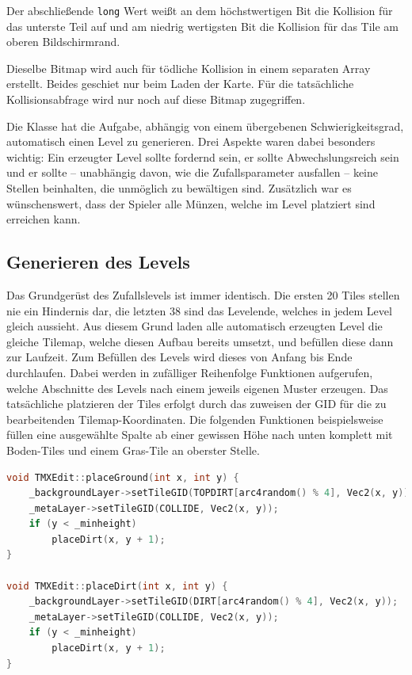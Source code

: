 Der abschließende \texttt{long} Wert weißt an dem höchstwertigen Bit die Kollision für das unterste Teil auf und am niedrig wertigsten Bit die Kollision für das Tile am oberen Bildschirmrand.

Dieselbe Bitmap wird auch für tödliche Kollision in einem separaten Array erstellt. Beides geschiet nur beim Laden der Karte. Für die tatsächliche Kollisionsabfrage wird nur noch auf diese Bitmap zugegriffen.


\label{sec:4_Automatisch erzeugte Tilemapst}

Die   Klasse hat die Aufgabe, abhängig von einem übergebenen Schwierigkeitsgrad, automatisch einen Level zu generieren. Drei Aspekte waren dabei besonders wichtig: Ein erzeugter Level sollte fordernd sein, er sollte Abwechslungsreich sein und er sollte – unabhängig davon, wie die Zufallsparameter ausfallen – keine Stellen beinhalten, die unmöglich zu bewältigen sind. Zusätzlich war es wünschenswert, dass der Spieler alle Münzen, welche im Level platziert sind erreichen kann.


\subsection{Generieren des Levels}
Das Grundgerüst des Zufallslevels ist immer identisch. Die ersten 20 Tiles stellen nie ein Hindernis dar, die letzten 38 sind das Levelende, welches in jedem Level gleich aussieht. Aus diesem Grund laden alle automatisch erzeugten Level die gleiche Tilemap, welche diesen Aufbau bereits umsetzt, und befüllen diese dann zur Laufzeit.
Zum Befüllen des Levels wird dieses von Anfang bis Ende durchlaufen.  Dabei werden in zufälliger Reihenfolge Funktionen aufgerufen, welche Abschnitte des Levels nach einem jeweils eigenen Muster erzeugen. Das tatsächliche platzieren der Tiles erfolgt durch das zuweisen der GID für die zu bearbeitenden Tilemap-Koordinaten. 
Die folgenden Funktionen beispielsweise füllen eine ausgewählte Spalte ab einer gewissen Höhe
nach unten komplett mit Boden-Tiles und einem Gras-Tile an oberster Stelle.

\begin{lstlisting}[label=lst:place_ground,
				   language=C++,
				   firstnumber=127,
				   caption=Platzieren von Boden-Tiles ( TMXEdit.cpp )]
void TMXEdit::placeGround(int x, int y) {
	_backgroundLayer->setTileGID(TOPDIRT[arc4random() % 4], Vec2(x, y));
	_metaLayer->setTileGID(COLLIDE, Vec2(x, y));
	if (y < _minheight)
		placeDirt(x, y + 1);
}

void TMXEdit::placeDirt(int x, int y) {
	_backgroundLayer->setTileGID(DIRT[arc4random() % 4], Vec2(x, y));
	_metaLayer->setTileGID(COLLIDE, Vec2(x, y));
	if (y < _minheight)
		placeDirt(x, y + 1);
}
\end{lstlisting}

